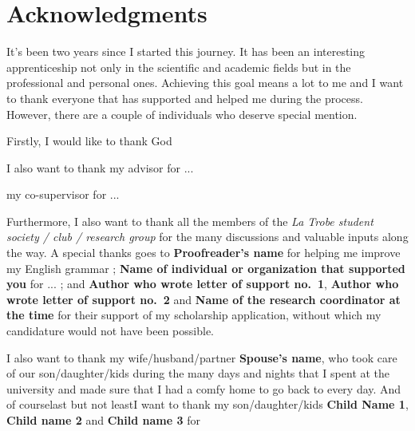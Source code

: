 \chapter*{Acknowledgments}

It’s been two years since I started this journey. It has been an interesting apprenticeship not only in the scientific and academic fields but in the professional and personal ones. Achieving this goal means a lot to me and I want to thank everyone that has supported and helped me during the process. However, there are a couple of individuals who deserve special mention.

Firstly, I would like to thank God 

I also want to thank my advisor \textbf{\myProfFirstName} \textbf{\myProfLastName} for ... 

 my co-supervisor \textbf{\myOtherProfTitle} \textbf{\myOtherProfFirstName} \textbf{\myOtherProfLastName} for ... 

Furthermore, I also want to thank all the members of the \emph{La Trobe student society / club / research group}  for the many discussions and valuable inputs along the way. A special thanks goes to \textbf{Proofreader's name} for helping me improve my English grammar ; \textbf{Name of individual or organization that supported you} for ... ; and \textbf{Author who wrote letter of support no.~1}, \textbf{Author who wrote letter of support no.~2} and \textbf{Name of the research coordinator at the time} for their support of my scholarship application, without which my candidature would not have been possible.

I also want to thank my wife/husband/partner \textbf{Spouse's name}, who took care of our son/daughter/kids during the many days and nights that I spent at the university and made sure that I had a comfy home to go back to every day. And of course\textemdash{}last but not least\textemdash{}I want to thank my son/daughter/kids \textbf{Child Name 1}, \textbf{Child name 2} and \textbf{Child name 3} for 

